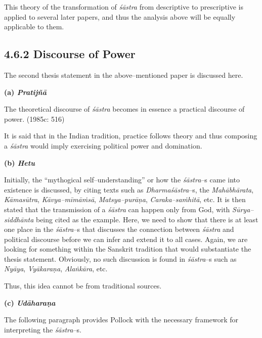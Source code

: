 This theory of the transformation of \textit{śāstra }from descriptive to prescriptive is applied to several later papers, and thus the analysis above will be equally applicable to them.


\subsection*{4.6.2 Discourse of Power}

The second thesis statement in the above–mentioned paper is discussed here.

\textbf{(a) \textit{Pratijñā }}

\begin{myquote}
The theoretical discourse of \textit{śāstra} becomes in essence a practical discourse of power. (1985c: 516)
\end{myquote}

It is said that in the Indian tradition, practice follows theory and thus composing a\textit{ śāstra }would imply exercising political power and domination.

\textbf{(b) \textit{Hetu}}

Initially, the “mythogical self–understanding” or how the \textit{śāstra}–s came into existence is discussed, by citing texts such as \textit{Dharmaśāstra}–s, the \textit{Mahābhārata}, \textit{Kāmasūtra}, \textit{Kāvya–mīmāṁsā}, \textit{Matsya–purāṇa}, \textit{Caraka–saṁhitā}, etc. It is then stated that the transmission of a \textit{śāstra }can happen only from God, with \textit{Sūrya–siddhānta} being cited as the example. Here, we need to show that there is at least one place in the\textit{ śāstra}–s that discusses the connection between \textit{śāstra} and political discourse before we can infer and extend it to all cases. Again, we are looking for something within the Sanskrit tradition that would substantiate the thesis statement. Obviously, no such discussion is found in \textit{śāstra}–s such as \textit{Nyāya}, \textit{Vyākaraṇa}, \textit{Alaṅkāra}, etc.

Thus, this idea cannot be from traditional sources.

\textbf{(c) \textit{Udāharaṇa}}

The following paragraph provides Pollock with the necessary framework for interpreting the \textit{śāstra}–s.

